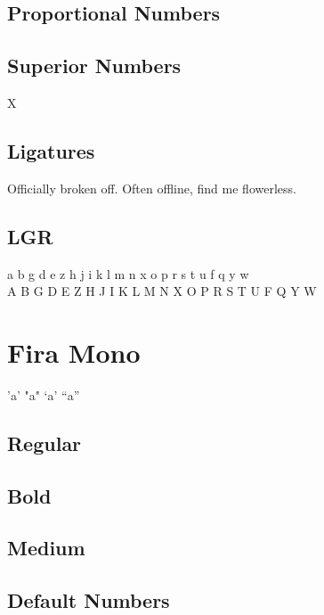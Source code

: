 \documentclass{article}
\begin{document}
\subsection*{Proportional Numbers}

{}

\subsection*{Superior Numbers}

X{}

\subsection*{Ligatures}


Officially broken off. Often offline, find me flowerless.

\subsection*{LGR}

{\firalgr\noindent
 a b g d e z h j i k l m n x o p r s t u f q y w\\
 A B G D E Z H J I K L M N X O P R S T U F Q Y W\\
}

\section*{Fira Mono}
\ttfamily


'a' \quad "a" \quad `a' \quad ``a''

\subsection*{Regular}

\lipsum[1]


\subsection*{Bold}
\ttfamily

\textbf{\lipsum[3]}

\subsection*{Medium}
{\firamonomedium\lipsum[8]}

\subsection*{Default Numbers}
\end{document}

